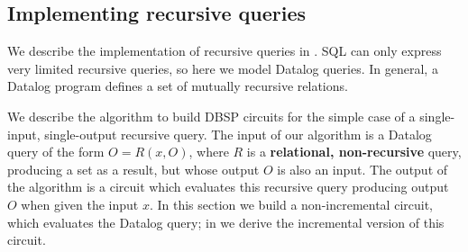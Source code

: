 
\subsection{Implementing recursive queries}\label{sec:datalog}

We describe the implementation of recursive queries in \dbsp.  SQL can
only express very limited recursive queries, so here we model Datalog
queries.  In general, a Datalog program defines a set of mutually
recursive relations.

We describe the algorithm to build DBSP circuits for the simple case
of a single-input, single-output recursive query.  The input of our
algorithm is a Datalog query of the form $O = R(x, O)$, where $R$ is a
\textbf{relational, non-recursive} query, producing a set as a result,
but whose output $O$ is also an input.  The output of the algorithm is
a \dbsp circuit which evaluates this recursive query producing output
$O$ when given the input $x$.  In this section we build a
non-incremental circuit, which evaluates the Datalog query; in
 we derive the incremental version of this circuit.

